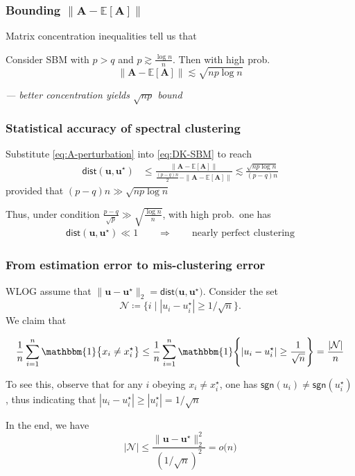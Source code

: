 \documentclass[compress,
mathserif,wide,%
]{beamer}
\begin{document}
\begin{frame}
\frametitle{Bounding $\| \bm{A}-\mathbb{E}[\bm{A}] \|$}

Matrix concentration inequalities tell us that 
%
\begin{lemma}
\label{lem:perturbation-SBM}
%
Consider SBM with $p>q$ and $p\gtrsim \frac{\log n}{n}$. Then with high prob. 
%
\begin{equation}
	\label{eq:A-perturbation}
	\|\bm{A}-\mathbb{E}[\bm{A}]\|\lesssim \sqrt{np \log n} 
\end{equation}
%
\end{lemma}

{\hfill \em --- better concentration yields $\sqrt{np}$ bound}
\end{frame}



\begin{frame}
\frametitle{Statistical accuracy of spectral clustering}

Substitute \eqref{eq:A-perturbation} into \eqref{eq:DK-SBM} to reach
%
\begin{align*}
	\mathsf{dist}( {\bm{u}}, \bm{u}^{\star}) &\leq \frac{\|\bm{A}-\mathbb{E}[\bm{A}]\|}{\frac{(p-q)n}{2}-\|\bm{A}-\mathbb{E}[\bm{A}]\|}  \lesssim \frac{\sqrt{np \log n}}{(p-q)n}
\end{align*}
%
provided that $(p-q)n \gg \sqrt{np \log n}$

\bigskip

Thus, under condition \alert{$\frac{p-q}{\sqrt{p}}\gg \sqrt{\tfrac{\log n}{n}} $}, with high prob.~one has
%
\begin{align*}
	\mathsf{dist}( {\bm{u}}, \bm{u}^{\star}) \ll 1  \qquad \Longrightarrow \qquad  \text{nearly perfect clustering}
\end{align*}
%


\end{frame}

\begin{frame}
	\frametitle{From estimation error to mis-clustering error}
	WLOG assume that $\|\bm{u}-\bm{u}^{\star}\|_{2}=\mathsf{dist}\big(\bm{u},\bm{u}^{\star}\big)$. Consider the set
%
$$
	\mathcal{N}\coloneqq \big\{ i\mid |u_{i}-u_{i}^{\star}| \geq {1}/{\sqrt{n}}\big\}.
$$
We claim that 

\[
	\frac{1}{n}\sum_{i=1}^{n} \mathbbm{1} \big\{ x_{i}\neq x_{i}^{\star}\big\}
	\leq \frac{1}{n}\sum_{i=1}^{n} \mathbbm{1} \Bigg \{ |u_i - u_{i}^{\star}| \geq \frac{1}{\sqrt{n}} \Bigg\}
	= \frac{|\mathcal{N}|}{n}
\]
	
	To see this, observe that for any $i$ obeying $x_{i}\neq x_{i}^{\star}$, one has $\mathsf{sgn}(u_{i})\neq \mathsf{sgn}(u_{i}^{\star})$,
thus indicating that $|u_i - u_{i}^{\star}| \geq |u_{i}^{\star}| = 1/\sqrt{n}$

In the end, we have
\[
|\mathcal{N}|\leq\frac{\|\bm{u}-\bm{u}^{\star}\|_{2}^{2}}{(1/\sqrt{n})^{2}}=o\big(n\big)
\]
\end{frame}
\end{document}
